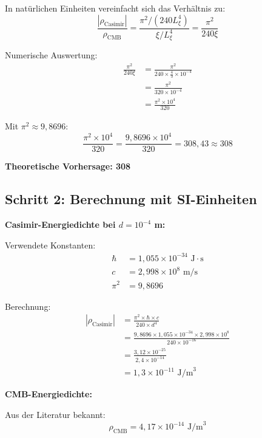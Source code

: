 \documentclass[12pt,a4paper]{article}
\begin{document}
		In nat\"urlichen Einheiten vereinfacht sich das Verh\"altnis zu:
		\begin{equation}
			\frac{|\rho_{\text{Casimir}}|}{\rho_{\text{CMB}}} = \frac{\pi^2/(240L_\xi^4)}{\xi/L_\xi^4} = \frac{\pi^2}{240\xi}
		\end{equation}
		
		Numerische Auswertung:
		\begin{align}
			\frac{\pi^2}{240\xi} &= \frac{\pi^2}{240 \times \frac{4}{3} \times 10^{-4}} \\
			&= \frac{\pi^2}{320 \times 10^{-4}} \\
			&= \frac{\pi^2 \times 10^4}{320}
		\end{align}
		
		Mit $\pi^2 \approx 9{,}8696$:
		\begin{equation}
			\frac{\pi^2 \times 10^4}{320} = \frac{9{,}8696 \times 10^4}{320} = 308{,}43 \approx 308
		\end{equation}
		
		\textbf{Theoretische Vorhersage: 308}
		
		\subsection{Schritt 2: Berechnung mit SI-Einheiten}
		
		\textbf{Casimir-Energiedichte bei $d = 10^{-4}$ m:}
		
		Verwendete Konstanten:
		\begin{align}
			\hbar &= 1{,}055 \times 10^{-34} \text{ J} \cdot \text{s} \\
			c &= 2{,}998 \times 10^8 \text{ m/s} \\
			\pi^2 &= 9{,}8696
		\end{align}
		
		Berechnung:
		\begin{align}
			|\rho_{\text{Casimir}}| &= \frac{\pi^2 \times \hbar \times c}{240 \times d^4} \\
			&= \frac{9{,}8696 \times 1{,}055 \times 10^{-34} \times 2{,}998 \times 10^8}{240 \times 10^{-16}} \\
			&= \frac{3{,}12 \times 10^{-25}}{2{,}4 \times 10^{-14}} \\
			&= 1{,}3 \times 10^{-11} \text{ J/m}^3
		\end{align}
		
		\textbf{CMB-Energiedichte:}
		
		Aus der Literatur bekannt:
		\begin{equation}
			\rho_{\text{CMB}} = 4{,}17 \times 10^{-14} \text{ J/m}^3
		\end{equation}
		
\end{document}
